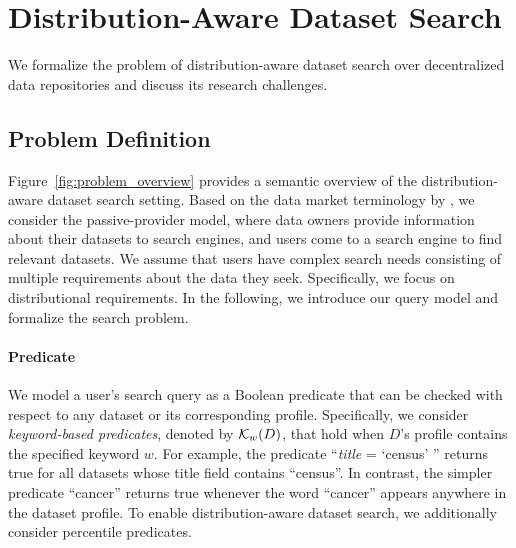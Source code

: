
\section{Distribution-Aware Dataset Search}
\label{sec:problem}

We formalize the problem of distribution-aware dataset search over decentralized data repositories and discuss its research challenges.

\subsection{Problem Definition}
\label{sec:problem_definition}

Figure~\ref{fig:problem_overview} provides a semantic overview of the distribution-aware dataset search setting.
Based on the data market terminology by \textcite{asudeh_towards_2022}, we consider the passive-provider model, where data owners provide information about their datasets to search engines, and users come to a search engine to find relevant datasets.
We assume that users have complex search needs consisting of multiple requirements about the data they seek.
Specifically, we focus on distributional requirements.
In the following, we introduce our query model and formalize the search problem.

\paragraph{Predicate}
We model a user's search query as a Boolean predicate that can be checked with respect to any dataset or its corresponding profile.
Specifically, we consider \emph{keyword-based predicates}, denoted by $\mathcal{K}_w(D)$, that hold when $D$'s profile contains the specified keyword $w$.
For example, the predicate ``\textit{title} = `census' '' returns true for all datasets whose title field contains ``census''.
In contrast, the simpler predicate ``cancer'' returns true whenever the word ``cancer'' appears anywhere in the dataset profile.
To enable distribution-aware dataset search, we additionally consider percentile predicates.

